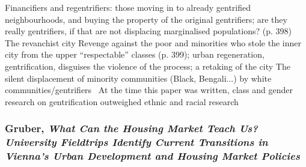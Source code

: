 \documentclass{article}
\begin{document}
\begin{outline}
		\2 Financifiers and regentrifiers: those moving in to already gentrified neighbourhoods, and buying the property of the original gentrifiers; are they really gentrifiers, if that are not displacing marginalised populations? (p. 398)
	\1 The revanchist city
		\2 Revenge against the poor and minorities who stole the inner city from the upper ``respectable'' classes (p. 399); urban regeneration, gentrification, disguises the violence of the process; a retaking of the city
		\2 The silent displacement of minority communities (Black, Bengali...) by white communities/gentrifiers\
	\1 At the time this paper was written, class and gender research on gentrification outweighed ethnic and racial research
\end{outline}

\subsubsection{Gruber, \textit{What Can the Housing Market Teach Us? University Fieldtrips Identify Current Transitions in Vienna's Urban Development and Housing Market Policies}} \parencite{gruber2020can}
\end{document}
